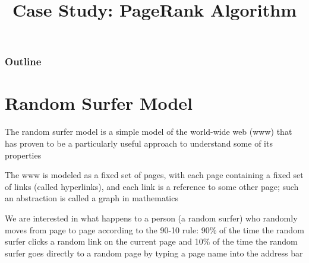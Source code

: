 \documentclass[8pt,a4paper,compress]{beamer}
\title{Case Study: PageRank Algorithm}
\date{}
\begin{document}
\begin{frame}
\vfill
\titlepage
\end{frame}

\begin{frame}
\frametitle{Outline}
\tableofcontents
\end{frame}

\section{Random Surfer Model}
\begin{frame}[fragile]
\pause

The random surfer model is a simple model of the world-wide web (www) that has proven to be a particularly useful approach to understand some of its properties

\pause
\bigskip

The www is modeled as a fixed set of pages, with each page containing a fixed set of links (called hyperlinks), and each link is a reference to some other page; such an abstraction is called a graph in mathematics

\pause
\bigskip

We are interested in what happens to a person (a random surfer) who randomly moves from page to page according to the 90-10 rule: 90\% of the time the random surfer clicks a random link on the current page and 10\% of the time the random surfer goes directly to a random page by typing a page name into the address bar
\end{frame}
\end{document}
